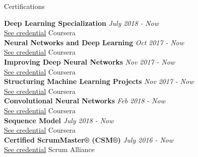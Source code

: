 \documentclass{resume} %
\begin{document}
\begin{rSection}{Certifications}

{\bf Deep Learning Specialization} \hfill {\em July 2018 - Now } 
\\ \href{https://www.coursera.org/account/accomplishments/specialization/TLSQP268HYTN}{See credential}\hfill { Coursera }
\\
{\bf Neural Networks and Deep Learning} \hfill {\em Oct 2017 - Now } 
\\ \href{https://www.coursera.org/account/accomplishments/verify/ZX6HNLJLTC78}{See credential}\hfill { Coursera }
\\
{\bf Improving Deep Neural Networks} \hfill {\em Nov 2017 - Now } 
\\ \href{https://www.coursera.org/account/accomplishments/verify/ED7FGSZ9FQWT}{See credential}\hfill { Coursera }
\\
{\bf Structuring Machine Learning Projects} \hfill {\em Nov 2017 - Now } 
\\ \href{https://www.coursera.org/account/accomplishments/verify/24FF824Y2JN2}{See credential}\hfill { Coursera }
\\
{\bf Convolutional Neural Networks} \hfill {\em Feb 2018 - Now } 
\\ \href{https://www.coursera.org/account/accomplishments/verify/SQVKAE5M6UT5}{See credential}\hfill { Coursera }
\\
{\bf Sequence Model} \hfill {\em July 2018 - Now } 
\\ \href{https://www.coursera.org/account/accomplishments/verify/3GKGQZN97W83}{See credential}\hfill { Coursera }
\\
{\bf Certified ScrumMaster® (CSM®)} \hfill {\em July 2016 - Now } 
\\ \href{http://bcert.me/sufosajdm}{See credential}\hfill { Scrum Alliance }

\end{rSection}
\end{document}
